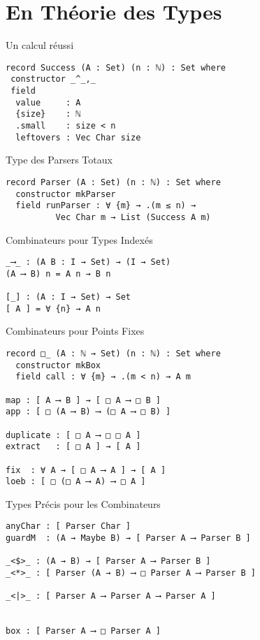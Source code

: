 \documentclass{beamer}
\begin{document}
\section{En Théorie des Types}

\begin{frame}[fragile]{Un calcul réussi}
\begin{verbatim}
record Success (A : Set) (n : ℕ) : Set where
 constructor _^_,_
 field
  value     : A
  {size}    : ℕ
  .small    : size < n
  leftovers : Vec Char size
\end{verbatim}
\end{frame}

\begin{frame}[fragile]{Type des Parsers Totaux}
\begin{verbatim}
record Parser (A : Set) (n : ℕ) : Set where
  constructor mkParser
  field runParser : ∀ {m} → .(m ≤ n) →
          Vec Char m → List (Success A m)
\end{verbatim}
\end{frame}

\begin{frame}[fragile]{Combinateurs pour Types Indexés}
\begin{verbatim}
_⟶_ : (A B : I → Set) → (I → Set)
(A ⟶ B) n = A n → B n

[_] : (A : I → Set) → Set
[ A ] = ∀ {n} → A n
\end{verbatim}
\end{frame}


\begin{frame}[fragile]{Combinateurs pour Points Fixes}
\begin{verbatim}
record □_ (A : ℕ → Set) (n : ℕ) : Set where
  constructor mkBox
  field call : ∀ {m} → .(m < n) → A m

map : [ A ⟶ B ] → [ □ A ⟶ □ B ]
app : [ □ (A ⟶ B) ⟶ (□ A ⟶ □ B) ]

duplicate : [ □ A ⟶ □ □ A ]
extract   : [ □ A ] → [ A ]

fix  : ∀ A → [ □ A ⟶ A ] → [ A ]
loeb : [ □ (□ A ⟶ A) ⟶ □ A ]
\end{verbatim}
\end{frame}

\begin{frame}[fragile]{Types Précis pour les Combinateurs}
\begin{verbatim}
anyChar : [ Parser Char ]
guardM  : (A → Maybe B) → [ Parser A ⟶ Parser B ]

_<$>_ : (A → B) → [ Parser A ⟶ Parser B ]
_<*>_ : [ Parser (A → B) ⟶ □ Parser A ⟶ Parser B ]

_<|>_ : [ Parser A ⟶ Parser A ⟶ Parser A ]


box : [ Parser A ⟶ □ Parser A ]
\end{verbatim}
\end{frame}
\end{document}
